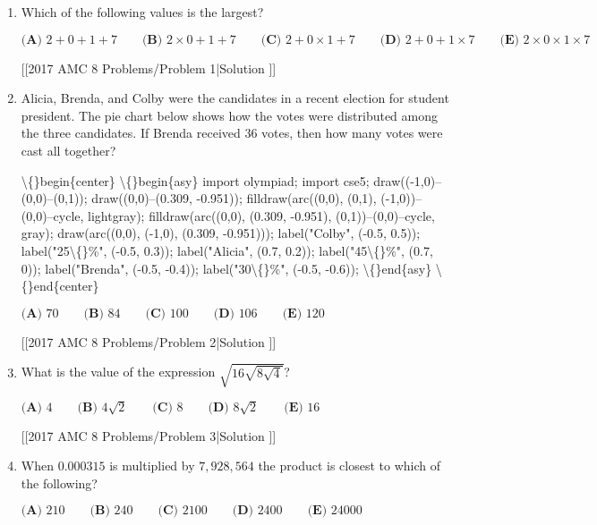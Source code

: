 \documentclass{article}
\begin{document}
\begin{enumerate}[label=\arabic*., itemsep=0.5em]\item Which of the following values is the largest?

\(\textbf{(A) }2+0+1+7\qquad\textbf{(B) }2 \times 0 +1+7\qquad\textbf{(C) }2+0 \times 1 + 7\qquad\textbf{(D) }2+0+1 \times 7\qquad\textbf{(E) }2 \times 0 \times 1 \times 7\)

[[2017 AMC 8 Problems/Problem 1|Solution
]]\par \vspace{0.5em}\item Alicia, Brenda, and Colby were the candidates in a recent election for student president. The pie chart below shows how the votes were distributed among the three candidates. If Brenda received \(36\) votes, then how many votes were cast all together?


\textbackslash\{\}begin\{center\}
\textbackslash\{\}begin\{asy\}
import olympiad;
import cse5;
draw((-1,0)--(0,0)--(0,1));
draw((0,0)--(0.309, -0.951));
filldraw(arc((0,0), (0,1), (-1,0))--(0,0)--cycle, lightgray);
filldraw(arc((0,0), (0.309, -0.951), (0,1))--(0,0)--cycle, gray);
draw(arc((0,0), (-1,0), (0.309, -0.951)));
label("Colby", (-0.5, 0.5));
label("25\textbackslash\{\}\%", (-0.5, 0.3));
label("Alicia", (0.7, 0.2));
label("45\textbackslash\{\}\%", (0.7, 0));
label("Brenda", (-0.5, -0.4));
label("30\textbackslash\{\}\%", (-0.5, -0.6));
\textbackslash\{\}end\{asy\}
\textbackslash\{\}end\{center\}


\(\textbf{(A) }70\qquad\textbf{(B) }84\qquad\textbf{(C) }100\qquad\textbf{(D) }106\qquad\textbf{(E) }120\)

[[2017 AMC 8 Problems/Problem 2|Solution
]]\par \vspace{0.5em}\item What is the value of the expression \(\sqrt{16\sqrt{8\sqrt{4}}}\)?

\(\textbf{(A) }4\qquad\textbf{(B) }4\sqrt{2}\qquad\textbf{(C) }8\qquad\textbf{(D) }8\sqrt{2}\qquad\textbf{(E) }16\)

[[2017 AMC 8 Problems/Problem 3|Solution
]]\par \vspace{0.5em}\item When \(0.000315\) is multiplied by \(7,928,564\) the product is closest to which of the following?

\(\textbf{(A) }210\qquad\textbf{(B) }240\qquad\textbf{(C) }2100\qquad\textbf{(D) }2400\qquad\textbf{(E) }24000\)


\end{enumerate}
\end{document}
